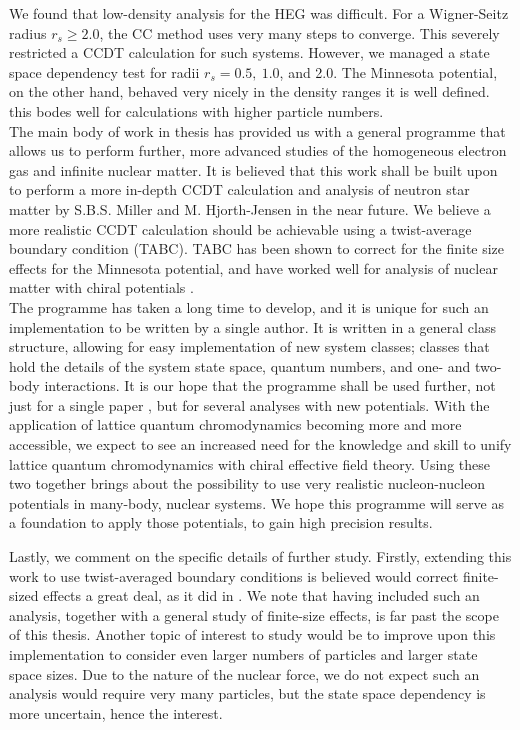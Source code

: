 \documentclass[10pt,twoside]{report}
\begin{document}
	We found that low-density analysis for the HEG was difficult. For a Wigner-Seitz radius $r_s\geq 2.0$, the CC method uses very many steps to converge. This severely restricted a CCDT calculation for such systems. However, we managed a state space dependency test for radii $r_s=0.5,\: 1.0$, and 2.0. The Minnesota potential, on the other hand, behaved very nicely in the density ranges it is well defined. this bodes well for calculations with higher particle numbers.\\
	
	The main body of work in thesis has provided us with a general programme that allows us to perform further, more advanced studies of the homogeneous electron gas and infinite nuclear matter. It is believed that this work shall be built upon to perform a more in-depth CCDT calculation and analysis of neutron star matter by S.B.S. Miller and M. Hjorth-Jensen in the near future. We believe a more realistic CCDT calculation should be achievable using a twist-average boundary condition (TABC). TABC has been shown \cite{HJensenLombardoKolck16} to correct for the finite size effects for the Minnesota potential, and have worked well for analysis of nuclear matter with chiral potentials \cite{GHagen14}.\\
	
	The programme has taken a long time to develop, and it is unique for such an implementation to be written by a single author. It is written in a general class structure, allowing for easy implementation of new system classes; classes that hold the details of the system state space, quantum numbers, and one- and two-body interactions. It is our hope that the programme shall be used further, not just for a single paper \cite{MillerHjorthJensen17}, but for several analyses with new potentials. With the application of lattice quantum chromodynamics becoming more and more accessible, we expect to see an increased need for the knowledge and skill to unify lattice quantum chromodynamics with chiral effective field theory. Using these two together brings about the possibility to use very realistic nucleon-nucleon potentials in many-body, nuclear systems. We hope this programme will serve as a foundation to apply those potentials, to gain high precision results.\\
	
	\newpage
	
	Lastly, we comment on the specific details of further study. Firstly, extending this work to use twist-averaged boundary conditions is believed would correct finite-sized effects a great deal, as it did in \cite{GHagen14}. We note that having included such an analysis, together with a general study of finite-size effects, is far past the scope of this thesis. Another topic of interest to study would be to improve upon this implementation to consider even larger numbers of particles and larger state space sizes. Due to the nature of the nuclear force, we do not expect such an analysis would require very many particles, but the state space dependency is more uncertain, hence the interest.
	
\end{document}
